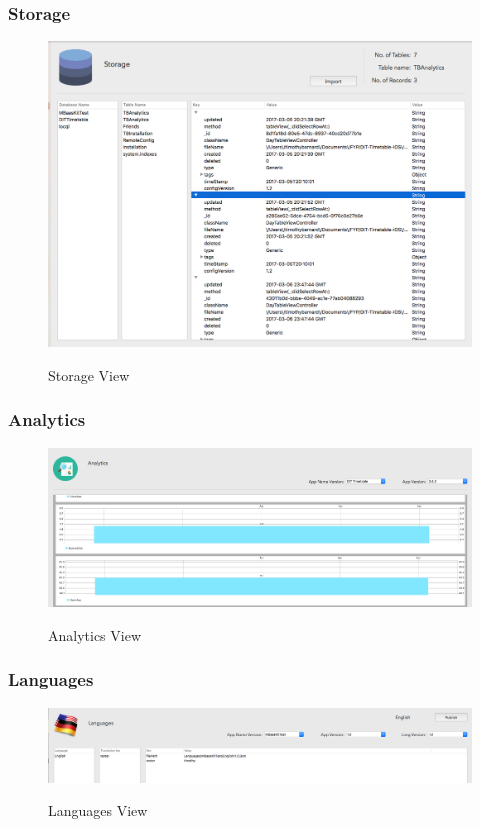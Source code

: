 \subsubsection{Storage}

\begin{figure}[!h]
    \caption{Storage View}
    \centering
    \includegraphics[width=120mm]{images/dashboard/storage}
    \label{fig:staff}
\end{figure} 

\subsubsection{Analytics}

\begin{figure}[!h]
    \caption{Analytics View}
    \centering
    \includegraphics[width=120mm]{images/dashboard/analytics}
    \label{fig:analytics}
\end{figure} 

\subsubsection{Languages}

\begin{figure}[!h]
    \caption{Languages View}
    \centering
    \includegraphics[width=120mm]{images/dashboard/languages}
    \label{fig:languages}
\end{figure} 

